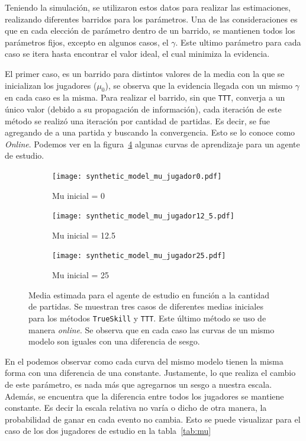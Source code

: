 \documentclass[11pt,twoside,spanish]{report} %
\begin{document}
Teniendo la simulaci\'on, se utilizaron estos datos para realizar las estimaciones, realizando diferentes barridos para los par\'ametros.
Una de las consideraciones es que en cada elecci\'on de par\'ametro dentro de un barrido, se mantienen todos los par\'ametros fijos,  excepto en algunos casos, el $\gamma$.
Este ultimo par\'ametro para cada caso se itera hasta encontrar el valor ideal, el cual minimiza la evidencia.

El primer caso, es  un barrido para distintos valores de la media con la que se inicializan los jugadores ($\mu_0$), se observa que la evidencia llegada con un mismo $\gamma$ en cada caso es la misma. Para realizar el barrido, sin que \texttt{TTT}, converja a un \'unico valor (debido a su propagaci\'on de informaci\'on), cada iteraci\'on de este m\'etodo se realiz\'o una iteraci\'on por cantidad de partidas.
Es decir, se fue agregando de a una partida y buscando la convergencia.
Esto se lo conoce como \textit{Online}.
Podemos ver en la figura~\ref{fig:Mu_lc} algunas curvas de aprendizaje para un agente de estudio.

\begin{figure}[H]
  \begin{subfigure}{0.33\textwidth}
    \texttt{[image: synthetic\_model\_mu\_jugador0.pdf]}
    \caption{Mu inicial = 0}
    \label{fig:Mu_jugador0}
  \end{subfigure}%
  \hfill
  \begin{subfigure}{0.33\textwidth}
    \texttt{[image: synthetic\_model\_mu\_jugador12\_5.pdf]}
    \caption{Mu inicial = 12.5}
    \label{fig:Mu_jugador12_5}
  \end{subfigure}%
  \hfill
  \begin{subfigure}{0.33\textwidth}
    \texttt{[image: synthetic\_model\_mu\_jugador25.pdf]}
    \caption{Mu inicial = 25}
    \label{fig:Mu_jugador25}
  \end{subfigure}

  \caption{Media estimada para el agente de estudio en funci\'on a la cantidad de partidas.	Se muestran tres casos de diferentes medias iniciales para los m\'etodos \texttt{TrueSkill} y \texttt{TTT}. Este \'ultimo m\'etodo se uso de manera \textit{online}. Se observa que en cada caso las curvas de un mismo modelo son iguales con una diferencia de sesgo.}
  \label{fig:Mu_lc}
\end{figure}


En el podemos observar como cada curva del mismo modelo tienen la misma forma con una diferencia de una constante.
Justamente, lo que realiza el cambio de este par\'ametro, es nada m\'as que agregarnos un sesgo a nuestra escala.
Adem\'as, se encuentra que la diferencia entre todos los jugadores se mantiene constante.
Es decir la escala relativa no var\'ia o dicho de otra manera, la probabilidad de ganar en cada evento no cambia.
Esto se puede visualizar para el caso de los dos jugadores de estudio en la tabla~\ref{tab:mu}
\end{document}

